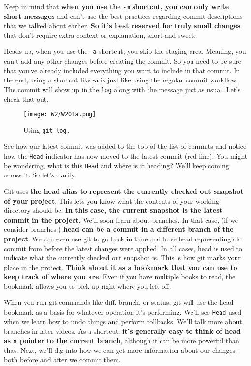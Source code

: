 	Keep in mind that \textbf{when you use the} \verb|-m| \textbf{shortcut, you can only write short messages} and can't use the best practices regarding commit descriptions that we talked about earlier. \textbf{So it's best reserved for truly small changes} that don't require extra context or explanation, short and sweet. 
	
	Heads up, when you use the \verb|-a| shortcut, you skip the staging area. Meaning, you can't add any other changes before creating the commit. So you need to be sure that you've already included everything you want to include in that commit. In the end, using a shortcut like -a is just like using the regular commit workflow. The commit will show up in the \texttt{log} along with the message just as usual. Let's check that out. 
	
	\begin{figure} 
		\caption{Using \texttt{git log.}}
		\centering
		\texttt{[image: W2/W201a.png]}
		\label{W201b}
	\end{figure}
	
	See how our latest commit was added to the top of the list of commits and notice how the \texttt{Head} indicator has now moved to the latest commit (red line). You might be wondering, what is this \texttt{Head} and where is it heading? We'll keep coming across it. So let's clarify. 
	
	Git uses \textbf{the head alias to represent the currently checked out snapshot of your project}. This lets you know what the contents of your working directory should be. 
	\textbf{In this case, the current snapshot is the latest commit in the project}. We'll soon learn about branches. In that case, (if we consider branches ) \textbf{head can be a commit in a different branch of the project}.
	We can even use git to go back in time and have head representing old commit from before the latest changes were applied.
	In all cases, head is used to indicate what the currently checked out snapshot is. This is how git marks your place in the project. \textbf{Think about it as a bookmark that you can use to keep track of where you are}. Even if you have multiple books to read, the bookmark allows you to pick up right where you left off. 

	When you run git commands like diff, branch, or status, git will use the head bookmark as a basis for whatever operation it's performing. We'll see \texttt{Head} used when we learn how to undo things and perform rollbacks. We'll talk more about branches in later videos. As a shortcut, \textbf{it's generally easy to think of head as a pointer to the current branch}, although it can be more powerful than that. Next, we'll dig into how we can get more information about our changes, both before and after we commit them.
	
